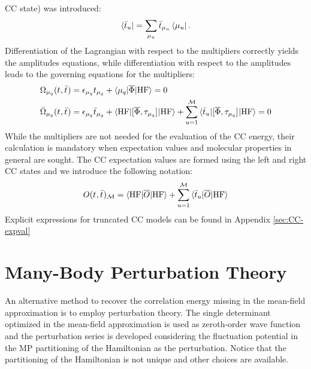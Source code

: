 \acrshort*{CC} state) was introduced:
\begin{equation}
  \label{eq:left-state}
  \bra{\bar{t}_{u}} = \sum_{\mu_u}\bar{t}_{\mu_u}\bra{\mu_u}.
\end{equation}
Differentiation of the Lagrangian with respect to the multipliers
correctly yields the amplitudes equations, while differentiation with
respect to the amplitudes leads to the governing equations for the
multipliers:
\begin{subequations}
  \begin{align}
   \Omega_{\mu_q}(t_{}, \bar{t}_{})  &=
   \epsilon_{\mu_q}t_{\mu_q} + \braket{\mu_q | \overline{\Phi} | \mathrm{HF}}
             = 0 \label{eq:cc-amplitudes}\\
   \bar{\Omega}_{\mu_q}(t_{}, \bar{t}_{})
    &=
    \epsilon_{\mu_q}\bar{t}_{\mu_q} +
    \braket{\mathrm{HF} | [ \overline{\Phi}, \tau_{\mu_q} ]^{} | \mathrm{HF}} +
    \sum_{u=1}^{\mathcal{M}}\braket{\bar{t}_{u} |
    [ \overline{\Phi}, \tau_{\mu_q} ]^{} | \mathrm{HF}}
             = 0 \label{eq:cc-multipliers}
  \end{align}
\end{subequations}
While the multipliers are not needed for the evaluation of the
\acrshort{CC} energy, their calculation is mandatory when expectation values
and molecular properties in general are sought.
The \acrshort{CC} expectation values are formed using the left and
right \acrshort{CC} states and we introduce the following notation:
\begin{equation}\label{eq:cc-expectation-value}
  O(t_{}, \bar{t}_{})_\mathcal{M} = \braket{\mathrm{HF} | \overline{O} | \mathrm{HF} }
  + \sum_{u=1}^{\mathcal{M}}\braket{\bar{t}_{u} | \overline{O} | \mathrm{HF} }
\end{equation}
Explicit expressions for truncated \acrshort{CC} models can be found in
Appendix \ref{sec:CC-expval}

\section{Many-Body Perturbation Theory}\label{sec:mbpt}

An alternative method to recover the correlation energy missing in the
mean-field approximation is to employ perturbation
theory.\autocite{Konishi2009-zb}
The single determinant optimized in the mean-field approximation is used
as zeroth-order wave function and the perturbation series is developed
considering the fluctuation potential in the \acrlong*{MP} partitioning
of the Hamiltonian as the perturbation.\autocite{McWeeny1992-oj, Helgaker2000-tz}
Notice that the partitioning of the Hamiltonian is not unique and
other choices are available.\autocite{Shavitt2009-mr}

